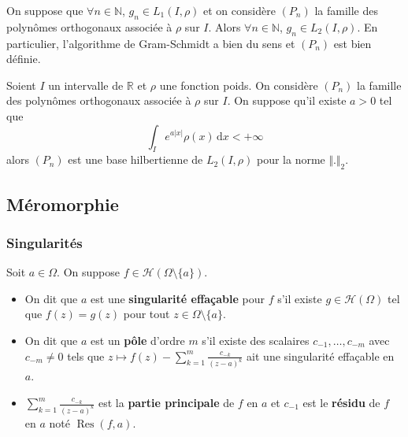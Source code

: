 
	\begin{lemma}
		On suppose que $\forall n \in \mathbb{N}$, $g_n \in L_1(I, \rho)$ et on considère $(P_n)$ la famille des polynômes orthogonaux associée à $\rho$ sur $I$. Alors $\forall n \in \mathbb{N}$, $g_n \in L_2(I, \rho)$. En particulier, l'algorithme de Gram-Schmidt a bien du sens et $(P_n)$ est bien définie.
	\end{lemma}


	\begin{application}
		Soient $I$ un intervalle de $\mathbb{R}$ et $\rho$ une fonction poids. On considère $(P_n)$ la famille des polynômes orthogonaux associée à $\rho$ sur $I$.
		\newpar
		On suppose qu'il existe $a > 0$ tel que
		\[ \int_I e^{a \vert x \vert} \rho(x) \, \mathrm{d}x < +\infty \]
		alors $(P_n)$ est une base hilbertienne de $L_2(I, \rho)$ pour la norme $\Vert . \Vert_2$.
	\end{application}

	\subsection{Méromorphie}

	\subsubsection{Singularités}


	\begin{definition}
		\label{245-2}
		Soit $a \in \Omega$. On suppose $f \in \mathcal{H}(\Omega \setminus \{ a \})$.
		\begin{itemize}
			\item On dit que $a$ est une \textbf{singularité effaçable} pour $f$ s'il existe $g \in \mathcal{H}(\Omega)$ tel que $f(z) = g(z)$ pour tout $z \in \Omega \setminus \{ a \}$.
			\item On dit que $a$ est un \textbf{pôle} d'ordre $m$ s'il existe des scalaires $c_{-1}, \dots, c_{-m}$ avec $c_{-m} \neq 0$ tels que $z \mapsto f(z) - \sum_{k=1}^m \frac{c_{-k}}{(z-a)^{k}}$ ait une singularité effaçable en $a$.
			\item $\sum_{k=1}^m \frac{c_{-k}}{(z-a)^{k}}$ est la \textbf{partie principale} de $f$ en $a$ et $c_{-1}$ est le \textbf{résidu} de $f$ en $a$ noté $\operatorname{Res}(f,a)$.
		\end{itemize}
	\end{definition}

